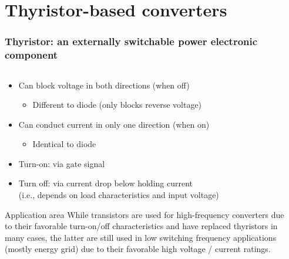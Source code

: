 \section{Thyristor-based converters}

\begin{frame}[c]
    \frametitle{Thyristor: an externally switchable power electronic component}
    \begin{columns}
        \begin{column}{0.66\textwidth}
            \begin{itemize}
                \item Can block voltage in both directions (when off)
                \begin{itemize}
                    \item Different to diode (only blocks reverse voltage)
                \end{itemize}
                \item Can conduct current in only one direction (when on)
                \begin{itemize}
                    \item Identical to diode
                \end{itemize}
                \item Turn-on: via gate signal
                \item Turn off: via current drop below holding current \\(i.e., depends on load characteristics and input voltage)
            \end{itemize}
            \vspace{-0.7cm}
            \begin{varblock}{Application area}
                While transistors are used for high-frequency converters due to their favorable turn-on/off characteristics and have replaced thyristors in many cases, the latter are still used in low switching frequency applications (mostly energy grid) due to their favorable high voltage / current ratings. 
            \end{varblock}
        \end{column}
        \begin{column}{0.33\textwidth}
                \centering
        

\end{column}
\end{columns}
\end{frame}

